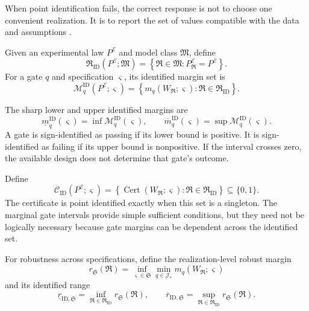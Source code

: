 
When point identification fails, the correct response is not to choose one
convenient realization. It is to report the set of values compatible with the
data and assumptions \cite{Manski2003,ImbensManski2004}.

\begin{definition}
\label{def:identified-realization-set}
Given an experimental law \(P^{\mathcal E}\) and model class \(\mathfrak M\),
define
\[
\boxed{
\mathfrak R_{\mathrm{ID}}
(P^{\mathcal E};\mathfrak M)
=
\left\{
\mathfrak R\in\mathfrak M:
P_{\mathfrak R}^{\mathcal E}=P^{\mathcal E}
\right\}.
}
\]
For a gate \(q\) and specification \(\varsigma\), its identified margin set is
\[
\mathcal M_q^{\mathrm{ID}}
(P^{\mathcal E};\varsigma)
=
\left\{
 m_q(W_{\mathfrak R};\varsigma):
\mathfrak R\in\mathfrak R_{\mathrm{ID}}
\right\}.
\]
\end{definition}

The sharp lower and upper identified margins are
\[
\underline m_q^{\mathrm{ID}}(\varsigma)
=
\inf\mathcal M_q^{\mathrm{ID}}(\varsigma),
\qquad
\overline m_q^{\mathrm{ID}}(\varsigma)
=
\sup\mathcal M_q^{\mathrm{ID}}(\varsigma).
\]
A gate is sign-identified as passing if its lower bound is positive. It is
sign-identified as failing if its upper bound is nonpositive. If the interval
crosses zero, the available design does not determine that gate's outcome.


Define
\[
\boxed{
\mathcal C_{\mathrm{ID}}
(P^{\mathcal E};\varsigma)
=
\left\{
\operatorname{Cert}(W_{\mathfrak R};\varsigma):
\mathfrak R\in\mathfrak R_{\mathrm{ID}}
\right\}
\subseteq\{0,1\}.
}
\]
The certificate is point identified exactly when this set is a singleton. The
marginal gate intervals provide simple sufficient conditions, but they need
not be logically necessary because gate margins can be dependent across the
identified set.

For robustness across specifications, define the realization-level robust
margin
\[
r_{\mathfrak S}(\mathfrak R)
=
\inf_{\varsigma\in\mathfrak S}
\min_{q\in\mathcal J_*}
 m_q(W_{\mathfrak R};\varsigma)
\]
and its identified range
\[
\underline r_{\mathrm{ID},\mathfrak S}
=
\inf_{\mathfrak R\in\mathfrak R_{\mathrm{ID}}}
 r_{\mathfrak S}(\mathfrak R),
\qquad
\overline r_{\mathrm{ID},\mathfrak S}
=
\sup_{\mathfrak R\in\mathfrak R_{\mathrm{ID}}}
 r_{\mathfrak S}(\mathfrak R).
\]

